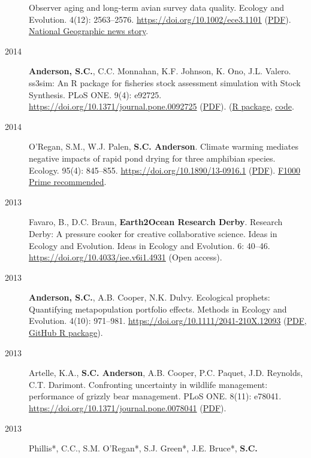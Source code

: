 \begin{description}
Observer aging and long-term avian survey data quality. Ecology and
Evolution. 4(12): 2563--2576. \url{https://doi.org/10.1002/ece3.1101}
(\href{http://onlinelibrary.wiley.com/doi/10.1002/ece3.1101/pdf}{PDF}).
\href{http://news.nationalgeographic.com/news/2014/08/140805-aging-birders-breeding-bird-survey-volunteers-science/}{National
Geographic news story}.
\item[2014]
\textbf{Anderson, S.C.}, C.C. Monnahan, K.F. Johnson, K. Ono, J.L.
Valero. ss3sim: An R package for fisheries stock assessment simulation
with Stock Synthesis. PLoS ONE. 9(4): e92725.
\url{https://doi.org/10.1371/journal.pone.0092725}
(\href{http://www.plosone.org/article/fetchObject.action?uri=info\%3Adoi\%2F10.1371\%2Fjournal.pone.0092725\&representation=PDF}{PDF}).
(\href{http://cran.r-project.org/web/packages/ss3sim/index.html}{R
package}, \href{https://github.com/ss3sim/ss3sim}{code}.
\item[2014]
O'Regan, S.M., W.J. Palen, \textbf{S.C. Anderson}. Climate warming
mediates negative impacts of rapid pond drying for three amphibian
species. Ecology. 95(4): 845--855.
\url{https://doi.org/10.1890/13-0916.1}
(\href{http://onlinelibrary.wiley.com/doi/10.1890/13-0916.1/epdf}{PDF}).
\href{https://facultyopinions.com/prime/718498042}{F1000 Prime
recommended}.
\item[2013]
Favaro, B., D.C. Braun, \textbf{Earth2Ocean Research Derby}. Research
Derby: A pressure cooker for creative collaborative science. Ideas in
Ecology and Evolution. Ideas in Ecology and Evolution. 6: 40--46.
\url{https://doi.org/10.4033/iee.v6i1.4931} (Open access).
\item[2013]
\textbf{Anderson, S.C.}, A.B. Cooper, N.K. Dulvy. Ecological prophets:
Quantifying metapopulation portfolio effects. Methods in Ecology and
Evolution. 4(10): 971--981.
\url{https://doi.org/10.1111/2041-210X.12093}
(\href{https://www.dropbox.com/s/7tx1h1pkmmp222j/Anderson_etal_2013_ecological_prophets_with_SOM.pdf?dl=1}{PDF},
\href{https://github.com/seananderson/ecofolio}{GitHub R package}).
\item[2013]
Artelle, K.A., \textbf{S.C. Anderson}, A.B. Cooper, P.C. Paquet, J.D.
Reynolds, C.T. Darimont. Confronting uncertainty in wildlife management:
performance of grizzly bear management. PLoS ONE. 8(11): e78041.
\url{https://doi.org/10.1371/journal.pone.0078041}
(\href{http://www.plosone.org/article/fetchObject.action?uri=info\%3Adoi\%2F10.1371\%2Fjournal.pone.0078041\&representation=PDF}{PDF}).
\item[2013]
Phillis*, C.C., S.M. O'Regan*, S.J. Green*, J.E. Bruce*, \textbf{S.C.
}
\end{description}

